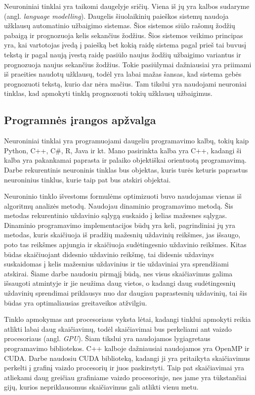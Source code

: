 Neuroniniai tinklai yra taikomi daugelyje sričių. Viena iš jų yra kalbos sudaryme (angl. \textit{language modelling}). Daugelis šiuolaikinių paieškos sistemų naudoja užklausų automatinio užbaigimo sistemas. Šios sistemos siūlo rašomų žodžių pabaigą ir prognozuoja kelis sekančius žodžius. Šios sistemos veikimo principas yra, kai vartotojas įvedą į paiešką bet kokią raidę sistema pagal prieš tai buvusį tekstą ir pagal naują įvestą raidę pasiūlo naujus žodžių užbaigimo variantus ir prognozuoja naujus sekančius žodžius. Tokie pasiūlymai dažniausiai yra priimami iš praeities naudotų užklausų, todėl yra labai mažas šansas, kad sistema gebės prognozuoti tekstą, kurio dar nėra mačius. Tam tikslui yra naudojami neuroniai tinklas, kad apmokyti tinklą prognozuoti tokių užklausų užbaigimus.\cite{park2017}



\subsection{Programnės įrangos apžvalga}


Neuroniniai tinklai yra programuojami daugeliu programavimo kalbų, tokių kaip Python, C++, C\#, R, Java ir kt. Mano pasirinkta kalba yra C++, kadangi ši kalba yra pakankamai paprasta ir palaiko objektiškai orientuotą programavimą. Darbe rekurentinis neuroninis tinklas bus objektas, kuris turės keturis paprastus neuroninius tinklus, kurie taip pat bus atskiri objektai.

Neuroninio tinklo išvestoms formulėms optimizuoti buvo naudojamas vienas iš algoritmų analizės metodų. Naudojau dinaminio programavimo metodą. Šis metodas rekurentinio uždavinio sąlygą suskaido į kelias mažesnes sąlygas. Dinaminio programavimo implementacijos būdų yra keli, pagrindiniai jų yra metodas, kuris skaičiuoja iš pradžių mažesnių uždavinių reikšmes, jas išsaugo, poto tas reikšmes apjungia ir skaičiuoja sudėtingesnio uždavinio reikšmes. Kitas būdas skaičiuojant didesnio uždavinio reikšmę, tai didesnis uždavinys suskaidomas į kelis mažesnius uždavinius ir tie uždaviniai yra sprendžiami atskirai. Šiame darbe naudosiu pirmąjį būdą, nes visus skaičiavimus galima išsaugoti atmintyje ir jie neužima daug vietos, o kadangi daug sudėtingesnių uždavinių sprendimai priklausys nuo dar daugiau paprastesnių uždavinių, tai šis būdas yra optimaliausias greitaveikos atžvilgiu. \cite{Robinett2005}

Tinklo apmokymas ant procesoriaus vyksta lėtai, kadangi tinklui apmokyti reikia atlikti labai daug skaičiavimų, todėl skaičiavimai bus perkeliami ant vaizdo procesoriaus (angl. \textit{GPU}). Šiam tikslui yra naudojamos lygiagretaus programavimo bibliotekos. C++ kalboje dažniausiai naudojamos yra OpenMP ir CUDA. Darbe naudosiu CUDA biblioteką, kadangi ji yra pritaikyta skaičiavimus perkelti į grafinį vaizdo procesorių ir juos paskirstyti. Taip pat skaičiavimai yra atliekami daug greičiau grafiniame vaizdo procesoriuje, nes jame yra tūkstančiai gijų, kurios nepriklausomus skaičiavimus gali atlikti vienu metu. \cite{Fazlul2014}

